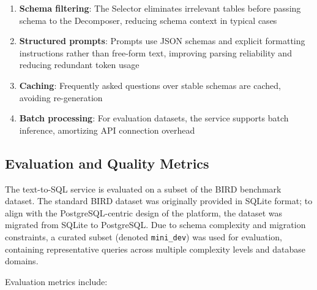 \begin{enumerate}
    \item \textbf{Schema filtering}: The Selector eliminates irrelevant tables before passing schema to the Decomposer, reducing schema context in typical cases
    \item \textbf{Structured prompts}: Prompts use JSON schemas and explicit formatting instructions rather than free-form text, improving parsing reliability and reducing redundant token usage
    \item \textbf{Caching}: Frequently asked questions over stable schemas are cached, avoiding re-generation
    \item \textbf{Batch processing}: For evaluation datasets, the service supports batch inference, amortizing API connection overhead
\end{enumerate}

\subsection{Evaluation and Quality Metrics}

The text-to-SQL service is evaluated on a subset of the BIRD benchmark dataset. The standard BIRD dataset was originally provided in SQLite format; to align with the PostgreSQL-centric design of the platform, the dataset was migrated from SQLite to PostgreSQL. Due to schema complexity and migration constraints, a curated subset (denoted \texttt{mini\_dev}) was used for evaluation, containing representative queries across multiple complexity levels and database domains.

Evaluation metrics include:

